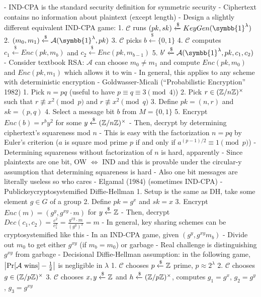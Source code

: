 \documentclass[notes]{agony}
\newcommand{\xgets}{\xleftarrow}
\newcommand{\ndgets}{\xgets{\mathdollar}}
\newcommand{\one}{\symbb{1}}
\begin{document}
\begin{markdown}
- IND-CPA is the standard security definition for symmetric security
    - Ciphertext contains no information about plaintext (except length)
- Design a slightly different equivalent IND-CPA game:
    1. $\mathcal C$ runs $(pk, sk) \ndgets KeyGen(\one^\lambda)$
    2. $(m_0,m_1) \ndgets \mathcal A(\one^\lambda, pk)$
    3. $\mathcal C$ picks $b \ndgets \{0,1\}$
    4. $\mathcal C$ computes $c_1 \ndgets Enc(pk, m_b)$ and $c_2 \ndgets Enc(pk, m_{b-1})$
    5. $b' \ndgets \mathcal A(\one^\lambda, pk, c_1, c_2)$
- Consider textbook RSA: $\mathcal A$ can choose $m_0 \neq m_1$ and compute $Enc(pk, m_0)$ and $Enc(pk, m_1)$ which allows it to win
    - In general, this applies to any scheme with deterministic encryption
- Goldwasser-Micali (``Probabilistic Encryption'' 1982)
    1. Pick $n = pq$ (useful to have $p \equiv q \equiv 3 \pmod 4$)
    2. Pick $r \in (\mathbb{Z}/n\mathbb{Z})^\times$ such that $r \not\equiv x^2 \pmod p$ and $r \not\equiv x^2 \pmod q$
    3. Define $pk = (n, r)$ and $sk = (p, q)$
    4. Select a message bit $b$ from $M = \{0,1\}$
    5. Encrypt $Enc(b) = r^b y^2$ for some $y \ndgets(\Z/n\Z)^\times$
    - Then, decrypt by determining ciphertext's squareness mod $n$
        - This is easy with the factorization $n=pq$ by Euler's criterion ($a$ is square mod prime $p$ if and only if $a^{(p-1)/2} \equiv 1 \pmod p$)
        - Determining squareness without factorization of $n$ is hard, apparently
    - Since plaintexts are one bit, OW $\iff$ IND and this is provable under the circular-y assumption that determining squareness is hard
    - Also one bit messages are literally useless so who cares
- Elgamal (1984) (sometimes IND-CPA)
    - Publickeycryptosystemified Diffie-Hellman
    1. Setup is the same as DH, take some element $g \in G$ of a group
    2. Define $pk = g^x$ and $sk = x$
    3. Encrypt $Enc(m) = (g^y, g^{xy}\cdot m)$ for $y \ndgets \Z$
    - Then, decrypt $Dec(c_1, c_2) = \frac{c^2}{c_1^x} = \frac{g^{xy}\cdot m}{(g^y)^x} = m$
    - In general, key sharing schemes can be cryptosystemified like this
    - In an IND-CPA game, given $(g^y, g^{xy}m_b)$
        - Divide out $m_0$ to get either $g^{xy}$ (if $m_b = m_0$) or garbage
        - Real challenge is distinguishing $g^{xy}$ from garbage
    - Decisional Diffie-Hellman assumption: in the following game, $\abs{\Pr[\mathcal A\text{ wins}]-\frac12}$ is negligible in $\lambda$
        1. $\mathcal C$ chooses $p \ndgets \Z$ prime, $p \approx 2^\lambda$
        2. $\mathcal C$ chooses $g \in (\mathbb{Z}/p\mathbb{Z})^\times$
        3. $\mathcal C$ chooses $x,y \ndgets \Z$ and $h \ndgets (\Z/p\Z)^\times$, computes $g_1 = g^x$, $g_2 = g^y$, $g_3 = g^{xy}$

\end{markdown}
\end{document}
